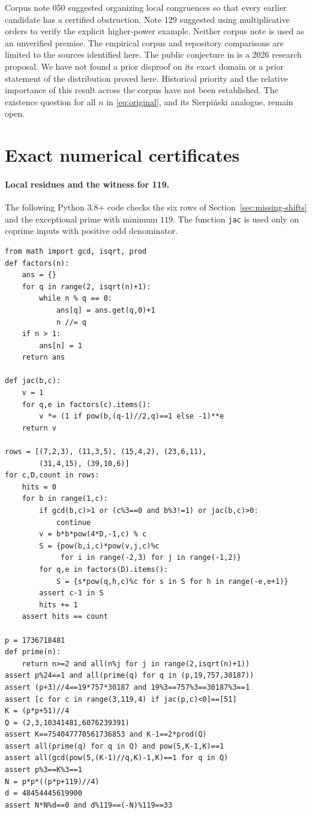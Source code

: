 \documentclass[a4paper,11pt]{article}
\theoremstyle{definition}\newtheorem{question}[theorem]{Question}
\begin{document}
Corpus note 050 \cite{vmrc} suggested organizing local congruences so that every earlier candidate has a certified obstruction. Note 129 suggested using multiplicative orders to verify the explicit higher-power example. Neither corpus note is used as an unverified premise. The empirical corpus and repository comparisons are limited to the sources identified here. The public conjecture in \cite{tier} is a 2026 research proposal. We have not found a prior disproof on its exact domain or a prior statement of the distribution proved here. Historical priority and the relative importance of this result across the corpus have not been established. The existence question for all $n$ in \eqref{eq:original}, and its Sierpi\'nski analogue, remain open.

\appendix
\section{Exact numerical certificates}\label{sec:cert}

\paragraph{Local residues and the witness for 119.}
The following Python 3.8+ code checks the six rows of Section~\ref{sec:missing-shifts} and the exceptional prime with minimum $119$. The function \texttt{jac} is used only on coprime inputs with positive odd denominator.
\begin{Verbatim}[fontsize=\small]
from math import gcd, isqrt, prod
def factors(n):
    ans = {}
    for q in range(2, isqrt(n)+1):
        while n % q == 0:
            ans[q] = ans.get(q,0)+1
            n //= q
    if n > 1:
        ans[n] = 1
    return ans

def jac(b,c):
    v = 1
    for q,e in factors(c).items():
        v *= (1 if pow(b,(q-1)//2,q)==1 else -1)**e
    return v

rows = [(7,2,3), (11,3,5), (15,4,2), (23,6,11),
        (31,4,15), (39,10,6)]
for c,D,count in rows:
    hits = 0
    for b in range(1,c):
        if gcd(b,c)>1 or (c%3==0 and b%3!=1) or jac(b,c)>0:
            continue
        v = b*b*pow(4*D,-1,c) % c
        S = {pow(b,i,c)*pow(v,j,c)%c
             for i in range(-2,3) for j in range(-1,2)}
        for q,e in factors(D).items():
            S = {s*pow(q,h,c)%c for s in S for h in range(-e,e+1)}
        assert c-1 in S
        hits += 1
    assert hits == count

p = 1736718481
def prime(n):
    return n>=2 and all(n%j for j in range(2,isqrt(n)+1))
assert p%24==1 and all(prime(q) for q in (p,19,757,30187))
assert (p+3)//4==19*757*30187 and 19%3==757%3==30187%3==1
assert [c for c in range(3,119,4) if jac(p,c)<0]==[51]
K = (p*p+51)//4
Q = (2,3,10341481,6076239391)
assert K==754047770561736853 and K-1==2*prod(Q)
assert all(prime(q) for q in Q) and pow(5,K-1,K)==1
assert all(gcd(pow(5,(K-1)//q,K)-1,K)==1 for q in Q)
assert p%3==K%3==1
N = p*p*((p*p+119)//4)
d = 48454445619900
assert N*N%d==0 and d%119==(-N)%119==33
\end{Verbatim}
\end{document}
